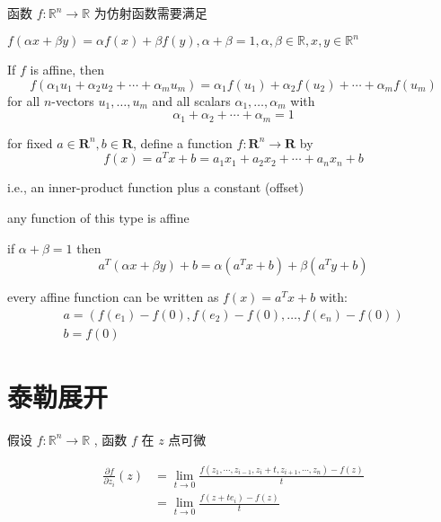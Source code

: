 \begin{theorem}
    函数 $ f: \mathbb{R}^{n} \rightarrow \mathbb{R} $ 为仿射函数需要满足

$ f(\alpha x+\beta y)=\alpha f(x)+\beta f(y), \alpha+\beta=1, \alpha, \beta \in \mathbb{R}, x, y \in \mathbb{R}^{n} $
\end{theorem}

\begin{corollary}
    If $ f $ is affine, then
$$
f\left(\alpha_{1} u_{1}+\alpha_{2} u_{2}+\cdots+\alpha_{m} u_{m}\right)=\alpha_{1} f\left(u_{1}\right)+\alpha_{2} f\left(u_{2}\right)+\cdots+\alpha_{m} f\left(u_{m}\right)
$$
for all $ n $-vectors $ u_{1}, \ldots, u_{m} $ and all scalars $ \alpha_{1}, \ldots, \alpha_{m} $ with
$$
\alpha_{1}+\alpha_{2}+\cdots+\alpha_{m}=1
$$
\end{corollary}

\begin{definition}
    for fixed $ a \in \mathbf{R}^{n}, b \in \mathbf{R} $, define a function $ f: \mathbf{R}^{n} \rightarrow \mathbf{R} $ by
$$
f(x)=a^{T} x+b=a_{1} x_{1}+a_{2} x_{2}+\cdots+a_{n} x_{n}+b
$$

i.e., an inner-product function plus a constant (offset)
\end{definition}

\begin{theorem}
    any function of this type is affine
    
    if $ \alpha+\beta=1 $ then
$$
a^{T}(\alpha x+\beta y)+b=\alpha\left(a^{T} x+b\right)+\beta\left(a^{T} y+b\right)
$$
\end{theorem}

\begin{theorem}
    every affine function can be written as $ f(x)=a^{T} x+b $ with:
$$
\begin{array}{l}
a=\left(f\left(e_{1}\right)-f(0), f\left(e_{2}\right)-f(0), \ldots, f\left(e_{n}\right)-f(0)\right) \\
b=f(0)
\end{array}
$$

\end{theorem}


\section{泰勒展开}

\begin{definition}[函数$f$第$i$个分量的一阶偏导数]
    假设 $ f: \mathbb{R}^{n} \rightarrow \mathbb{R} $ , 函数 $ f $ 在 $ z $ 点可微

    $$ \begin{aligned} \frac{\partial f}{\partial z_{i}}(z) &=\lim _{t \rightarrow 0} \frac{f\left(z_{1}, \cdots, z_{i-1}, z_{i}+t, z_{i+1}, \cdots, z_{n}\right)-f(z)}{t} \\ &=\lim _{t \rightarrow 0} \frac{f\left(z+t e_{i}\right)-f(z)}{t} \end{aligned} $$
\end{definition}

